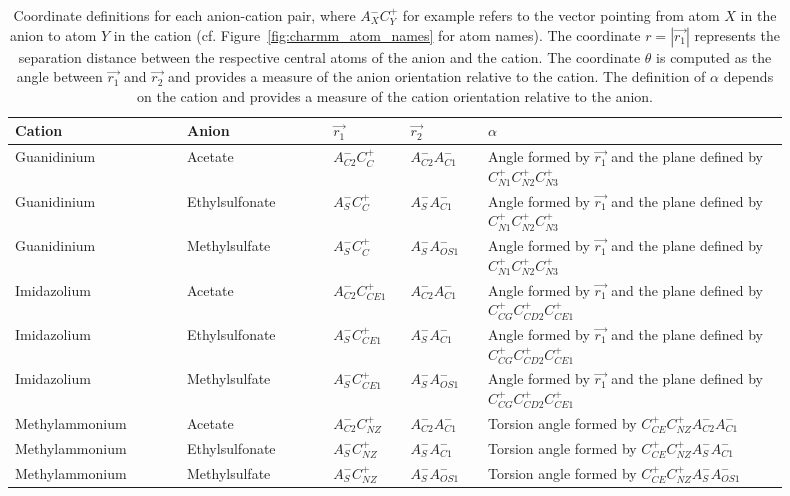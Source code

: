 \documentclass[journal=jacsat,articletitle=true,manuscript=suppinfo,layout=onecolumn]{achemso}
\begin{document}
    \begin{table}[H]
    \caption{Coordinate definitions for each anion-cation pair, where $A_{X}^{-}C_{Y}^{+}$ for example refers to the vector pointing from atom $X$ in the anion to atom $Y$ in the cation (cf. Figure~\ref{fig:charmm_atom_names} for atom names). The coordinate $r = | \vec{r_1} |$ represents the separation distance between the respective central atoms of the anion and the cation. The coordinate $\theta$ is computed as the angle between $\vec{r_1}$ and $\vec{r_2}$ and provides a measure of the anion orientation relative to the cation. The definition of $\alpha$ depends on the cation and provides a measure of the cation orientation relative to the anion.}
    \label{tab:coordinates}
    \centering
    \renewcommand{\arraystretch}{1.5}
    \begin{tabular}{>{\centering\arraybackslash}m{0.2\linewidth} | >{\centering\arraybackslash}m{0.17\linewidth} | >{\centering\arraybackslash}m{0.09\linewidth} | >{\centering\arraybackslash}m{0.09\linewidth} | >{\centering\arraybackslash}m{0.35\linewidth}}
    
    Cation         & Anion          & $\vec{r_1}$     & $\vec{r_2}$    & $\alpha$                                                                    \\ \hline
    Guanidinium    & Acetate        & $A_{C2}^{-}C_{C}^{+}$   & $A_{C2}^{-}A_{C1}^{-}$ & Angle formed by $\vec{r_1}$ and the plane defined by $C_{N1}^{+}C_{N2}^{+}C_{N3}^{+}$ \\
    Guanidinium    & Ethylsulfonate & $A_{S}^{-}C_{C}^{+}$    & $A_{S}^{-}A_{C1}^{-}$  & Angle formed by $\vec{r_1}$ and the plane defined by $C_{N1}^{+}C_{N2}^{+}C_{N3}^{+}$ \\
    Guanidinium    & Methylsulfate  & $A_{S}^{-}C_{C}^{+}$    & $A_{S}^{-}A_{OS1}^{-}$ & Angle formed by $\vec{r_1}$ and the plane defined by $C_{N1}^{+}C_{N2}^{+}C_{N3}^{+}$ \\ \hline
    Imidazolium    & Acetate        & $A_{C2}^{-}C_{CE1}^{+}$ & $A_{C2}^{-}A_{C1}^{-}$ & Angle formed by $\vec{r_1}$ and the plane defined by $C_{CG}^{+}C_{CD2}^{+}C_{CE1}^{+}$  \\
    Imidazolium    & Ethylsulfonate & $A_{S}^{-}C_{CE1}^{+}$  & $A_{S}^{-}A_{C1}^{-}$  & Angle formed by $\vec{r_1}$ and the plane defined by $C_{CG}^{+}C_{CD2}^{+}C_{CE1}^{+}$  \\
    Imidazolium    & Methylsulfate  & $A_{S}^{-}C_{CE1}^{+}$  & $A_{S}^{-}A_{OS1}^{-}$ & Angle formed by $\vec{r_1}$ and the plane defined by $C_{CG}^{+}C_{CD2}^{+}C_{CE1}^{+}$  \\ \hline
    Methylammonium & Acetate        & $A_{C2}^{-}C_{NZ}^{+}$  & $A_{C2}^{-}A_{C1}^{-}$ & Torsion angle formed by $C_{CE}^{+}C_{NZ}^{+}A_{C2}^{-}A_{C1}^{-}$ \\
    Methylammonium & Ethylsulfonate & $A_{S}^{-}C_{NZ}^{+}$   & $A_{S}^{-}A_{C1}^{-}$  & Torsion angle formed by $C_{CE}^{+}C_{NZ}^{+}A_{S}^{-}A_{C1}^{-}$ \\
    Methylammonium & Methylsulfate  & $A_{S}^{-}C_{NZ}^{+}$   & $A_{S}^{-}A_{OS1}^{-}$ & Torsion angle formed by $C_{CE}^{+}C_{NZ}^{+}A_{S}^{-}A_{OS1}^{-}$ 
    \end{tabular}
    \end{table}
\end{document}
